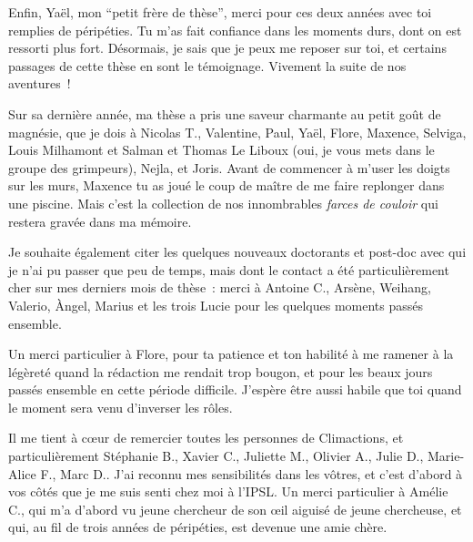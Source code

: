 {\noindent
Enfin, Yaël, mon ``petit frère de thèse'', merci pour ces deux années avec toi remplies de péripéties. Tu m'as fait confiance dans les moments durs, dont on est ressorti plus fort. Désormais, je sais que je peux me reposer sur toi, et certains passages de cette thèse en sont le témoignage. Vivement la suite de nos aventures~! 
\vspace{1em}

Sur sa dernière année, ma thèse a pris une saveur charmante au petit goût de magnésie, que je dois à Nicolas T., Valentine, Paul, Yaël, Flore, Maxence, Selviga, Louis Milhamont et Salman et Thomas Le Liboux (oui, je vous mets dans le groupe des grimpeurs), Nejla, et Joris. 
\noindent
Avant de commencer à m'user les doigts sur les murs, Maxence tu as joué le coup de maître de me faire replonger dans une piscine. Mais c'est la collection de nos innombrables \textit{farces de couloir} qui restera gravée dans ma mémoire.

\noindent
Je souhaite également citer les quelques nouveaux doctorants et post-doc avec qui je n'ai pu passer que peu de temps, mais dont le contact a été particulièrement cher sur mes derniers mois de thèse~: merci à Antoine C., Arsène, Weihang, Valerio, \`Angel, Marius et les trois Lucie pour les quelques moments passés ensemble.
\vspace{1em}

Un merci particulier à Flore, pour ta patience et ton habilité à me ramener à la légèreté quand la rédaction me rendait trop bougon, et pour les beaux jours passés ensemble en cette période difficile. J'espère être aussi habile que toi quand le moment sera venu d'inverser les rôles.
\vspace{1em}

Il me tient à c\oe ur de remercier toutes les personnes de Climactions, et particulièrement Stéphanie B., Xavier C., Juliette M., Olivier A., Julie D., Marie-Alice F., Marc D.. J'ai reconnu mes sensibilités dans les vôtres, et c'est d'abord à vos côtés que je me suis senti chez moi à l'IPSL. %
Un merci particulier à Amélie C., qui m'a d'abord vu jeune chercheur de son \oe il aiguisé de jeune chercheuse, et qui, au fil de trois années de péripéties, est devenue une amie chère.  
\vspace{1em}
 
}

